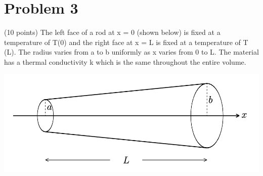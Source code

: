 \documentclass[12pt]{article}
\begin{document}
    
    \pagebreak
    \section{Problem 3}
        (10 points) The left face of a rod at x = 0 (shown below) is ﬁxed at a temperature of T(0) and the right face at x = L is ﬁxed at a temperature of T (L). 
        The radius varies from a to b uniformly as x varies from 0 to L. The material has a thermal conductivity k which is the same throughout the entire volume.
        \begin{center}
            \includegraphics[width=\textwidth]{picture_3.png}
        \end{center}
\end{document}
